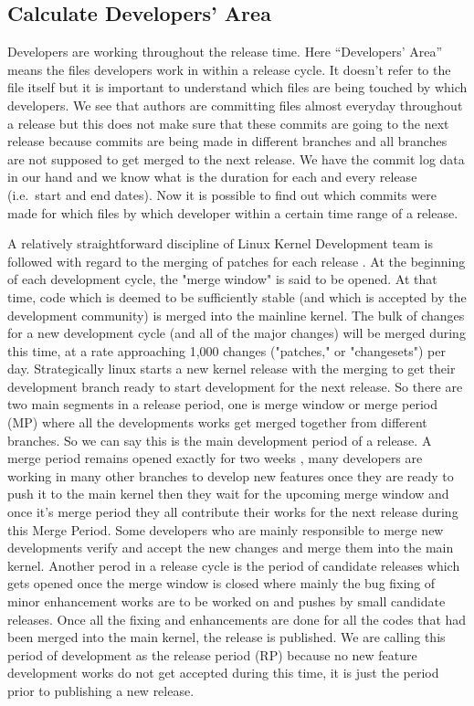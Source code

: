 \documentclass{acm_proc_article-sp}
\begin{document}
\subsection{Calculate Developers' Area}
Developers are working throughout the release time. Here ``Developers' Area'' means the files developers work in within a release cycle. It doesn't refer to the file itself but it is important to understand which files are being touched by which developers. We see that authors are committing files almost everyday throughout a release but this does not make sure that these commits are going to the next release because commits are being made in different branches and all branches are not supposed to get merged to the next release. We have the commit log data in our hand and we know what is the duration for each and every release (i.e.\ start and end dates). Now it is possible to find out which commits were made for which files by which developer within a certain time range of a release.

A relatively straightforward discipline of Linux Kernel Development team is followed with regard to the merging of patches for each release \cite{linux_kernel}.  At the beginning of each development cycle, the "merge window" is said to be opened.  At that time, code which is deemed to be sufficiently stable (and which is accepted by the development community) is merged into the mainline kernel. The bulk of changes for a new development cycle (and all of the major changes) will be merged during this time, at a rate approaching 1,000 changes ("patches," or "changesets") per day. Strategically linux starts a new kernel release with the merging to get their development branch ready to start development for the next release. So there are two main segments in a release period, one is merge window or merge period (MP) where all the developments works get merged together from different branches. So we can say this is the main development period of a release. A merge period remains opened exactly for two weeks \cite{linux_kernel}, many developers are working in many other branches to develop new features once they are ready to push it to the main kernel then they wait for the upcoming merge window and once it's merge period they all contribute their works for the next release during this Merge Period. Some developers who are mainly responsible to merge new developments verify and accept the new changes and merge them into the main kernel. Another perod in a release cycle is the period of candidate releases which gets opened once the merge window is closed where mainly the bug fixing of minor enhancement works are to be worked on and pushes by small candidate releases. Once all the fixing and enhancements are done for all the codes that had been merged into the main kernel, the release is published. We are calling this period of development as the release period (RP) because no new feature development works do not get accepted during this time, it is just the period prior to publishing a new release.
\end{document}

